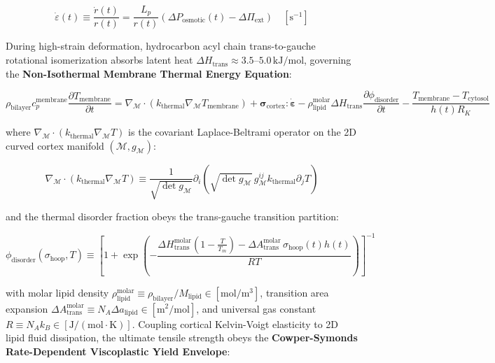 \documentclass[11pt,a4paper]{article}
\theoremstyle{definition}
\theoremstyle{remark}
\begin{document}
\begin{equation}
\dot{\varepsilon}(t) \equiv \frac{\dot{r}(t)}{r(t)} = \frac{L_p}{r(t)} \left( \Delta P_{\text{osmotic}}(t) - \Delta \Pi_{\text{ext}} \right) \quad [\mathrm{s}^{-1}]
\end{equation}


During high-strain deformation, hydrocarbon acyl chain trans-to-gauche rotational isomerization absorbs latent heat $\Delta H_{\text{trans}} \approx 3.5\text{--}5.0 \, \mathrm{kJ/mol}$, governing the \textbf{Non-Isothermal Membrane Thermal Energy Equation}:


\begin{equation}
\boxed{\rho_{\text{bilayer}} c_p^{\text{membrane}} \frac{\partial T_{\text{membrane}}}{\partial t} = \nabla_{\mathcal{M}} \cdot (k_{\text{thermal}} \nabla_{\mathcal{M}} T_{\text{membrane}}) + \boldsymbol{\sigma}_{\text{cortex}} : \dot{\boldsymbol{\varepsilon}} - \rho_{\text{lipid}}^{\text{molar}} \Delta H_{\text{trans}} \frac{\partial \phi_{\text{disorder}}}{\partial t} - \frac{T_{\text{membrane}} - T_{\text{cytosol}}}{h(t) R_K}}
\end{equation}


where $\nabla_{\mathcal{M}} \cdot (k_{\text{thermal}} \nabla_{\mathcal{M}} T)$ is the covariant Laplace-Beltrami operator on the 2D curved cortex manifold $(\mathcal{M}, g_{\mathcal{M}})$:


\begin{equation}
\nabla_{\mathcal{M}} \cdot (k_{\text{thermal}} \nabla_{\mathcal{M}} T) \equiv \frac{1}{\sqrt{\det g_{\mathcal{M}}}} \partial_i \left( \sqrt{\det g_{\mathcal{M}}} \, g_{\mathcal{M}}^{ij} k_{\text{thermal}} \partial_j T \right)
\end{equation}


and the thermal disorder fraction obeys the trans-gauche transition partition:


\begin{equation}
\phi_{\text{disorder}}(\sigma_{\text{hoop}}, T) \equiv \left[ 1 + \exp\left( -\frac{\Delta H_{\text{trans}}^{\text{molar}}\left(1 - \frac{T}{T_m}\right) - \Delta A_{\text{trans}}^{\text{molar}} \, \sigma_{\text{hoop}}(t) h(t)}{R T} \right) \right]^{-1}
\end{equation}


with molar lipid density $\rho_{\text{lipid}}^{\text{molar}} \equiv \rho_{\text{bilayer}}/M_{\text{lipid}} \in [\mathrm{mol/m^3}]$, transition area expansion $\Delta A_{\text{trans}}^{\text{molar}} \equiv N_A \Delta a_{\text{lipid}} \in [\mathrm{m^2/mol}]$, and universal gas constant $R \equiv N_A k_B \in [\mathrm{J/(mol\cdot K)}]$. Coupling cortical Kelvin-Voigt elasticity to 2D lipid fluid dissipation, the ultimate tensile strength obeys the \textbf{Cowper-Symonds Rate-Dependent Viscoplastic Yield Envelope}:
\end{document}
